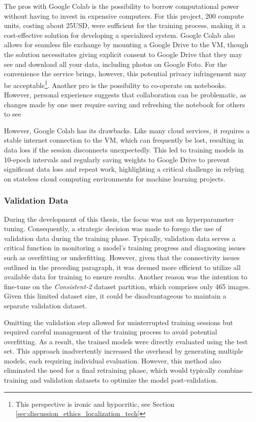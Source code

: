 \newpage
The pros with Google Colab is the possibility to borrow computational power without having to invest in expensive computers. For this project, 200 compute units, costing about 25USD, were sufficient for the training process, making it a cost-effective solution for developing a specialized system. Google Colab also allows for seamless file exchange by mounting a Google Drive to the VM, though the solution necessitates giving explicit consent to Google Drive that they may see and download all your data, including photos on Google Foto. For the convenience the service brings, however, this potential privacy infringement may be acceptable\footnote{This perspective is ironic and hypocritic, see Section \ref{sec:discussion_ethics_localization_tech}}. Another pro is the possibility to co-operate on notebooks. However, personal experience suggests that collaboration can be problematic, as changes made by one user require saving and refreshing the notebook for others to see

However, Google Colab has its drawbacks. Like many cloud services, it requires a stable internet connection to the VM, which can frequently be lost, resulting in data loss if the session disconnects unexpectedly. This led to training models in 10-epoch intervals and regularly saving weights to Google Drive to prevent significant data loss and repeat work, highlighting a critical challenge in relying on stateless cloud computing environments for machine learning projects.

\subsubsection{Validation Data}
During the development of this thesis, the focus was not on hyperparameter tuning. Consequently, a strategic decision was made to forego the use of validation data during the training phase. Typically, validation data serves a critical function in monitoring a model's training progress and diagnosing issues such as overfitting or underfitting. However, given that the connectivity issues outlined in the preceding paragraph, it was deemed more efficient to utilize all available data for training to ensure results. Another reason was the intention to fine-tune on the \textit{Consistent-2} dataset partition, which comprises only 465 images. Given this limited dataset size, it could be disadvantageous to maintain a separate validation dataset.

Omitting the validation step allowed for uninterrupted training sessions but required careful management of the training process to avoid potential overfitting. As a result, the trained models were directly evaluated using the test set. This approach inadvertently increased the overhead by generating multiple models, each requiring individual evaluation. However, this method also eliminated the need for a final retraining phase, which would typically combine training and validation datasets to optimize the model post-validation.

